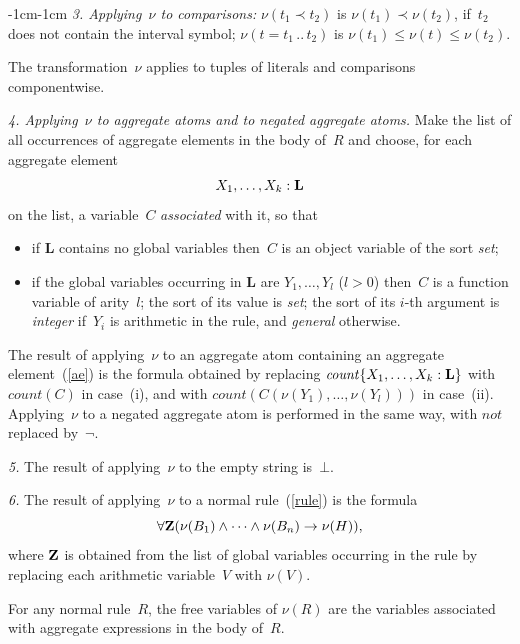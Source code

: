 \documentclass[11pt]{article}
\def\beq{\begin{equation}}
\def\eeq#1{\label{#1}\end{equation}}
\newcommand{\co}{\ensuremath{\mathit{count}}}
\newcommand{\no}{\ensuremath{\mathit{not}}}
\begin{document}
\begin{adjustwidth}{-1cm}{-1cm}
\medskip\noindent \emph{3. Applying~$\nu$ to comparisons: }
$\nu(t_1\prec t_2)$ is $\nu(t_1)\prec\nu(t_2)$, if~$t_2$ does not
contain the interval symbol;
$\nu(t = t_1\,..\,t_2)$ is $\nu(t_1)\leq\nu(t)\leq \nu(t_2)$.

\medskip
The transformation~$\nu$ applies to tuples of literals and comparisons
componentwise.

\medskip\noindent \emph{4. Applying~$\nu$ to aggregate atoms and to negated
aggregate atoms.}  Make the list of all occurrences of
aggregate elements in the body of~$R$ and choose, for each
aggregate element
\beq
X_1,\dots,X_k:{\bf L}
\eeq{ae}
on the list, a variable~$C$ \emph{associated} with it, so that
\begin{itemize}
\item[(i)] if {\bf L} contains no global variables
  then~$C$ is an object variable of the sort \emph{set};
\item[(ii)] if the global variables occurring in {\bf L} are $Y_1,\dots,Y_l$
  ($l>0$) then~$C$ is a function variable of arity~$l$; the sort of its value
  is \emph{set}; the sort of its $i$-th argument is \emph{integer}
  if~$Y_i$ is arithmetic in the rule, and \emph{general}
  otherwise.
\end{itemize}
The result of applying~$\nu$ to an aggregate atom
containing an aggregate element~(\ref{ae}) is the formula
obtained by replacing $\co\{X_1,\dots,X_k:{\bf L}\}$ with $\co(C)$ in case~(i),
and with $\co(C(\nu(Y_1),\dots,\nu(Y_l)))$ in case~(ii).
Applying~$\nu$ to a negated aggregate atom is performed in the same way,
with $\no$ replaced by~$\neg$.

\medskip\noindent
\emph{5.} The result of applying~$\nu$ to the empty string is~$\bot$.

\medskip\noindent
\emph{6.} The result of applying~$\nu$ to a normal rule~(\ref{rule}) is
the formula
\beq
\forall {\bf Z}(\nu(B_1)\land\cdots\land\nu(B_n) \to \nu(H)),
\eeq{nu}
where $\bf Z$ is obtained from the list of global
variables occurring in the rule
by replacing each arithmetic variable~$V$ with $\nu(V)$.

For any normal rule~$R$, the free variables of $\nu(R)$ are the variables
associated with aggregate expressions in the body of~$R$.



\end{adjustwidth}
\end{document}
